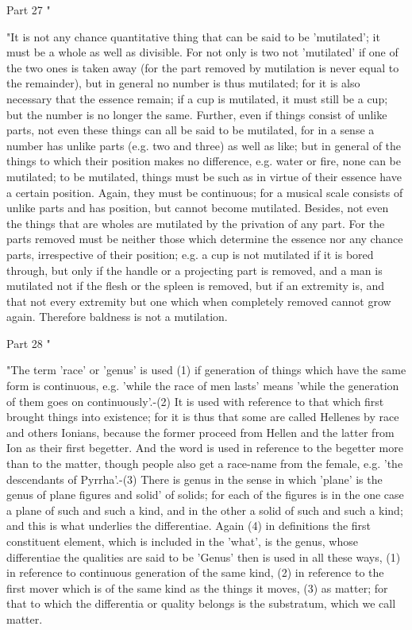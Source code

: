 Part 27 "

"It is not any chance quantitative thing that can be said to be 'mutilated';
it must be a whole as well as divisible. For not only is two not 'mutilated'
if one of the two ones is taken away (for the part removed by mutilation
is never equal to the remainder), but in general no number is thus
mutilated; for it is also necessary that the essence remain; if a
cup is mutilated, it must still be a cup; but the number is no longer
the same. Further, even if things consist of unlike parts, not even
these things can all be said to be mutilated, for in a sense a number
has unlike parts (e.g. two and three) as well as like; but in general
of the things to which their position makes no difference, e.g. water
or fire, none can be mutilated; to be mutilated, things must be such
as in virtue of their essence have a certain position. Again, they
must be continuous; for a musical scale consists of unlike parts and
has position, but cannot become mutilated. Besides, not even the things
that are wholes are mutilated by the privation of any part. For the
parts removed must be neither those which determine the essence nor
any chance parts, irrespective of their position; e.g. a cup is not
mutilated if it is bored through, but only if the handle or a projecting
part is removed, and a man is mutilated not if the flesh or the spleen
is removed, but if an extremity is, and that not every extremity but
one which when completely removed cannot grow again. Therefore baldness
is not a mutilation. 

Part 28 "

"The term 'race' or 'genus' is used (1) if generation of things which
have the same form is continuous, e.g. 'while the race of men lasts'
means 'while the generation of them goes on continuously'.-(2) It
is used with reference to that which first brought things into existence;
for it is thus that some are called Hellenes by race and others Ionians,
because the former proceed from Hellen and the latter from Ion as
their first begetter. And the word is used in reference to the begetter
more than to the matter, though people also get a race-name from the
female, e.g. 'the descendants of Pyrrha'.-(3) There is genus in the
sense in which 'plane' is the genus of plane figures and solid' of
solids; for each of the figures is in the one case a plane of such
and such a kind, and in the other a solid of such and such a kind;
and this is what underlies the differentiae. Again (4) in definitions
the first constituent element, which is included in the 'what', is
the genus, whose differentiae the qualities are said to be 'Genus'
then is used in all these ways, (1) in reference to continuous generation
of the same kind, (2) in reference to the first mover which is of
the same kind as the things it moves, (3) as matter; for that to which
the differentia or quality belongs is the substratum, which we call
matter. 

